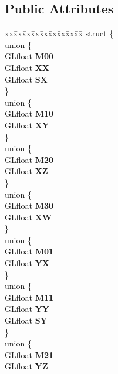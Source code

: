 \subsection*{Public Attributes}
\begin{DoxyCompactItemize}
\item 
\begin{tabbing}
xx\=xx\=xx\=xx\=xx\=xx\=xx\=xx\=xx\=\kill
struct \{\\
\>union \{\\
\>\>GLfloat {\bfseries M00}\\
\>\>GLfloat {\bfseries XX}\\
\>\>GLfloat {\bfseries SX}\\
\>\} \label{structMatrix4f__t_1_1@22_a3067f9ffdf183959374f38d09473139c}
\\
\>union \{\\
\>\>GLfloat {\bfseries M10}\\
\>\>GLfloat {\bfseries XY}\\
\>\} \label{structMatrix4f__t_1_1@22_a5bd0da7fba0134062365f099cfefbf98}
\\
\>union \{\\
\>\>GLfloat {\bfseries M20}\\
\>\>GLfloat {\bfseries XZ}\\
\>\} \label{structMatrix4f__t_1_1@22_af3375a9f28e57099ac346627857d6c06}
\\
\>union \{\\
\>\>GLfloat {\bfseries M30}\\
\>\>GLfloat {\bfseries XW}\\
\>\} \label{structMatrix4f__t_1_1@22_a99cf382f0b9f37b50ba3a2f527fd1caf}
\\
\>union \{\\
\>\>GLfloat {\bfseries M01}\\
\>\>GLfloat {\bfseries YX}\\
\>\} \label{structMatrix4f__t_1_1@22_a20ceacf2ab8b9a4258281b64674e877f}
\\
\>union \{\\
\>\>GLfloat {\bfseries M11}\\
\>\>GLfloat {\bfseries YY}\\
\>\>GLfloat {\bfseries SY}\\
\>\} \label{structMatrix4f__t_1_1@22_aa9f565652f906b78b49cddb8a13c76a4}
\\
\>union \{\\
\>\>GLfloat {\bfseries M21}\\
\>\>GLfloat {\bfseries YZ}\\

\end{tabbing}
\end{DoxyCompactItemize}
